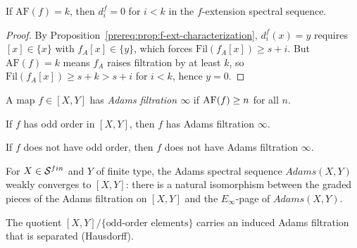 \begin{corollary}\label{prereq:cor:af-vanishing}
    \leanok
    If $\mathrm{AF}(f) = k$, then $d_i^f = 0$ for $i < k$ in the $f$-extension spectral sequence.
\end{corollary}
\begin{proof} By Proposition~\ref{prereq:prop:f-ext-characterization}, $d_i^f(x) = y$ requires $[x] \in \{x\}$ with $f_A[x] \in \{y\}$, which forces $\mathrm{Fil}(f_A[x]) \ge s + i$. But $\mathrm{AF}(f) = k$ means $f_A$ raises filtration by at least $k$, so $\mathrm{Fil}(f_A[x]) \ge s + k > s + i$ for $i < k$, hence $y = 0$.  %
\end{proof}

\begin{definition}\label{prereq:def:adams-filtration-infinity}
    A map $f \in [X, Y]$ has \emph{Adams filtration $\infty$} if $\mathrm{AF}(f) \ge n$ for all $n$.
\end{definition}

\begin{theorem}\label{prereq:thm:odd-order-af-infinity}
    If $f$ has odd order in $[X,Y]$, then $f$ has Adams filtration $\infty$.
\end{theorem}

\begin{axiom}\label{prereq:ax:not-odd-order-af-finite}
    If $f$ does not have odd order, then $f$ does not have Adams filtration $\infty$.
\end{axiom}

\begin{axiom}\label{prereq:ax:adams-weak-convergence}
    For $X \in {\mathcal S}^{fin}$ and $Y$ of finite type, the Adams spectral sequence $Adams(X,Y)$ weakly converges to $[X, Y]$: there is a natural isomorphism between the graded pieces of the Adams filtration on $[X, Y]$ and the $E_\infty$-page of $Adams(X,Y)$.
\end{axiom}

\begin{theorem}\label{prereq:thm:adams-separated}
    The quotient $[X, Y] / \{\text{odd-order elements}\}$ carries an induced Adams filtration that is separated (Hausdorff).
\end{theorem}


